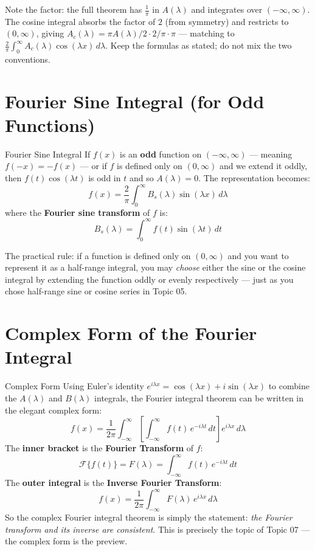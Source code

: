 \documentclass[12pt,a4paper]{article}
\begin{document}
Note the factor: the full theorem has $\frac{1}{\pi}$ in $A(\lambda)$ and integrates over $(-\infty,\infty)$. The cosine integral absorbs the factor of $2$ (from symmetry) and restricts to $(0,\infty)$, giving $A_c(\lambda) = \pi A(\lambda)/2 \cdot 2/\pi \cdot \pi$ --- matching to $\frac{2}{\pi}\int_0^\infty A_c(\lambda)\cos(\lambda x)\,d\lambda$. Keep the formulas as stated; do not mix the two conventions.

\section{Fourier Sine Integral (for Odd Functions)}

\begin{infobox}{Fourier Sine Integral}
If $f(x)$ is an \textbf{odd} function on $(-\infty,\infty)$ --- meaning $f(-x)=-f(x)$ --- or if $f$ is defined only on $(0,\infty)$ and we extend it oddly, then $f(t)\cos(\lambda t)$ is odd in $t$ and so $A(\lambda)=0$. The representation becomes:
\[
  f(x) = \frac{2}{\pi}\int_0^\infty B_s(\lambda)\sin(\lambda x)\,d\lambda
\]
where the \textbf{Fourier sine transform} of $f$ is:
\[
  B_s(\lambda) = \int_0^\infty f(t)\sin(\lambda t)\,dt
\]
\end{infobox}

The practical rule: if a function is defined only on $(0,\infty)$ and you want to represent it as a half-range integral, you may \textit{choose} either the sine or the cosine integral by extending the function oddly or evenly respectively --- just as you chose half-range sine or cosine series in Topic 05.

\section{Complex Form of the Fourier Integral}

\begin{infobox}{Complex Form}
Using Euler's identity $e^{i\lambda x} = \cos(\lambda x) + i\sin(\lambda x)$ to combine the $A(\lambda)$ and $B(\lambda)$ integrals, the Fourier integral theorem can be written in the elegant complex form:
\[
  f(x) = \frac{1}{2\pi}\int_{-\infty}^{\infty}\left[\int_{-\infty}^{\infty}f(t)\,e^{-i\lambda t}\,dt\right]e^{i\lambda x}\,d\lambda
\]
The \textbf{inner bracket} is the \textbf{Fourier Transform} of $f$:
\[
  \mathcal{F}\{f(t)\} = F(\lambda) = \int_{-\infty}^{\infty} f(t)\,e^{-i\lambda t}\,dt
\]
The \textbf{outer integral} is the \textbf{Inverse Fourier Transform}:
\[
  f(x) = \frac{1}{2\pi}\int_{-\infty}^{\infty} F(\lambda)\,e^{i\lambda x}\,d\lambda
\]
So the complex Fourier integral theorem is simply the statement: \textit{the Fourier transform and its inverse are consistent}. This is precisely the topic of Topic 07 --- the complex form is the preview.
\end{infobox}
\end{document}

